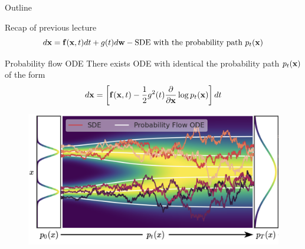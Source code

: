 

\usepackage{tikz}

\usetikzlibrary{arrows,shapes,positioning,shadows,trees}

\begin{frame}
\titlepage
\end{frame}
\begin{frame}{Outline}
	\tableofcontents
\end{frame}
\begin{frame}{Recap of previous lecture}
	\vspace{-0.5cm}
	\[
		d\mathbf{x} = \mathbf{f}(\mathbf{x}, t) dt + g(t) d \mathbf{w} - \text{SDE with the probability path } p_t(\mathbf{x})
	\]
	\vspace{-0.5cm}
	\begin{block}{Probability flow ODE}
		There exists ODE with identical the probability path $p_t(\mathbf{x})$ of the form
		\vspace{-0.3cm}
		\[
			d\mathbf{x} = \left[\mathbf{f}(\mathbf{x}, t) -\frac{1}{2} g^2(t) \frac{\partial}{\partial \mathbf{x}} \log p_t(\mathbf{x}) \right] dt
		\]
		\vspace{-0.3cm}
	\end{block}
	\begin{figure}
		\includegraphics[width=0.75\linewidth]{figs/probability_flow}
	\end{figure}
\end{frame}
